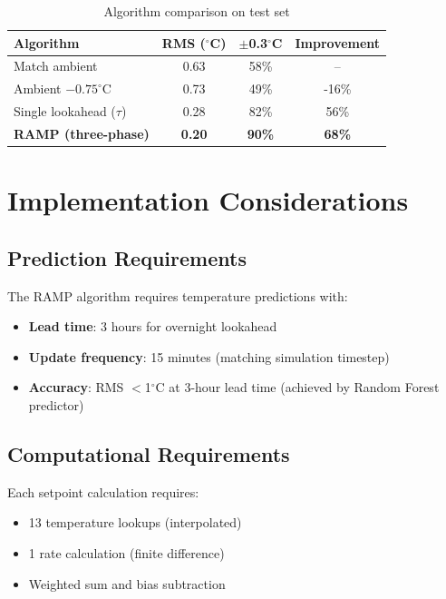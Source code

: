 \documentclass[11pt,letterpaper]{article}
\begin{document}
\begin{table}[H]
\centering
\caption{Algorithm comparison on test set}
\begin{tabular}{lccc}
\toprule
\textbf{Algorithm} & \textbf{RMS ($^\circ$C)} & \textbf{$\pm$0.3$^\circ$C} & \textbf{Improvement} \\
\midrule
Match ambient & 0.63 & 58\% & -- \\
Ambient $-0.75^\circ$C & 0.73 & 49\% & -16\% \\
Single lookahead ($\tau$) & 0.28 & 82\% & 56\% \\
\textbf{RAMP (three-phase)} & \textbf{0.20} & \textbf{90\%} & \textbf{68\%} \\
\bottomrule
\end{tabular}
\end{table}

\section{Implementation Considerations}

\subsection{Prediction Requirements}

The RAMP algorithm requires temperature predictions with:
\begin{itemize}[noitemsep]
    \item \textbf{Lead time}: 3 hours for overnight lookahead
    \item \textbf{Update frequency}: 15 minutes (matching simulation timestep)
    \item \textbf{Accuracy}: RMS $<$1$^\circ$C at 3-hour lead time (achieved by Random Forest predictor)
\end{itemize}

\subsection{Computational Requirements}

Each setpoint calculation requires:
\begin{itemize}[noitemsep]
    \item 13 temperature lookups (interpolated)
    \item 1 rate calculation (finite difference)
    \item Weighted sum and bias subtraction
\end{itemize}
\end{document}
